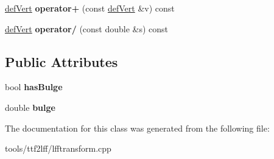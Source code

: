 \begin{DoxyCompactItemize}
\item 
\hypertarget{classdefVert_a7382d14be037fa748f1a4c5bc74de4f4}{\hyperlink{classdefVert}{def\-Vert} {\bfseries operator+} (const \hyperlink{classdefVert}{def\-Vert} \&v) const }\label{classdefVert_a7382d14be037fa748f1a4c5bc74de4f4}

\item 
\hypertarget{classdefVert_addcaebaf86ecec1c4115167e39ee2878}{\hyperlink{classdefVert}{def\-Vert} {\bfseries operator/} (const double \&s) const }\label{classdefVert_addcaebaf86ecec1c4115167e39ee2878}

\end{DoxyCompactItemize}
\subsection*{Public Attributes}
\begin{DoxyCompactItemize}
\item 
\hypertarget{classdefVert_a5838885be5cf279d9e885d5527ef5fdb}{bool {\bfseries has\-Bulge}}\label{classdefVert_a5838885be5cf279d9e885d5527ef5fdb}

\item 
\hypertarget{classdefVert_a294605f2753d6e8b1be466ac7e42b500}{double {\bfseries bulge}}\label{classdefVert_a294605f2753d6e8b1be466ac7e42b500}

\end{DoxyCompactItemize}


The documentation for this class was generated from the following file\-:\begin{DoxyCompactItemize}
\item 
tools/ttf2lff/lfftransform.\-cpp\end{DoxyCompactItemize}
